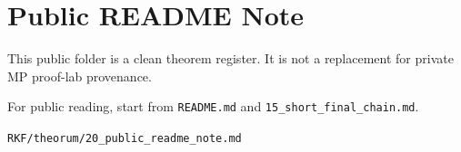 \hypertarget{public-readme-note}{%
\chapter{Public README Note}\label{public-readme-note}}

This public folder is a clean theorem register. It is not a replacement for private MP proof-lab provenance.

For public reading, start from \texttt{README.md} and \texttt{15\_short\_final\_chain.md}.

\begin{flushright}\small\texttt{RKF/theorum/20\_public\_readme\_note.md}\end{flushright}
